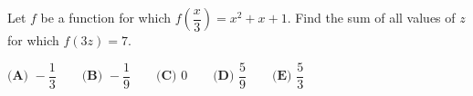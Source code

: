 Let $f$ be a function for which $f\left(\dfrac x3\right)=x^2+x+1$. Find the sum of all values of $z$ for which $f(3z)=7$.

$\textbf{(A) }-\dfrac13\qquad\textbf{(B) }-\dfrac19\qquad\textbf{(C) }0\qquad\textbf{(D) }\dfrac59\qquad\textbf{(E) }\dfrac53$
